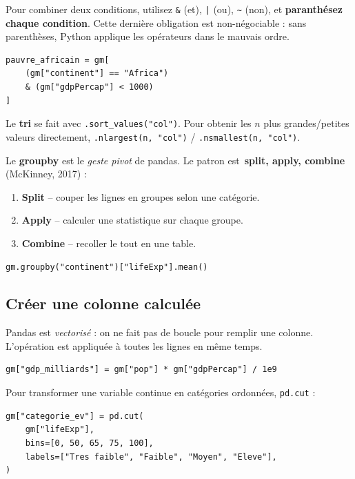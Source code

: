\documentclass[11pt,a4paper]{article}
\providecommand{\og}{\guillemotleft\,}
\providecommand{\fg}{\,\guillemotright}
\begin{document}
Pour combiner deux conditions, utilisez \texttt{\&} (et), \texttt{|} (ou),
\texttt{\~{}} (non), et \textbf{paranth\'esez chaque condition}. Cette
derni\`ere obligation est non-n\'egociable : sans parenth\`eses,
Python applique les op\'erateurs dans le mauvais ordre.

\begin{verbatim}
pauvre_africain = gm[
    (gm["continent"] == "Africa")
    & (gm["gdpPercap"] < 1000)
]
\end{verbatim}

Le \textbf{tri} se fait avec \texttt{.sort\_values("col")}. Pour obtenir
les $n$ plus grandes/petites valeurs directement,
\texttt{.nlargest(n, "col")} / \texttt{.nsmallest(n, "col")}.

Le \textbf{groupby} est le \emph{geste pivot} de pandas. Le patron est
\textbf{\og split, apply, combine \fg{}} (McKinney, 2017) :

\begin{enumerate}
  \item \textbf{Split} -- couper les lignes en groupes selon une
        cat\'egorie.
  \item \textbf{Apply} -- calculer une statistique sur chaque groupe.
  \item \textbf{Combine} -- recoller le tout en une table.
\end{enumerate}

\begin{verbatim}
gm.groupby("continent")["lifeExp"].mean()
\end{verbatim}

\subsection{Cr\'eer une colonne calcul\'ee}

Pandas est \emph{vectoris\'e} : on ne fait pas de boucle pour remplir une
colonne. L'op\'eration est appliqu\'ee \`a toutes les lignes en m\^eme
temps.

\begin{verbatim}
gm["gdp_milliards"] = gm["pop"] * gm["gdpPercap"] / 1e9
\end{verbatim}

Pour transformer une variable continue en cat\'egories ordonn\'ees,
\texttt{pd.cut} :

\begin{verbatim}
gm["categorie_ev"] = pd.cut(
    gm["lifeExp"],
    bins=[0, 50, 65, 75, 100],
    labels=["Tres faible", "Faible", "Moyen", "Eleve"],
)
\end{verbatim}
\end{document}
